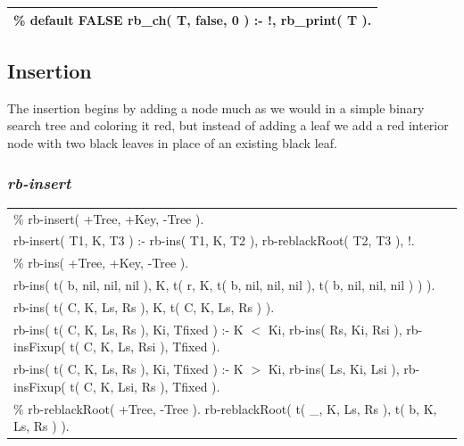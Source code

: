 \documentclass{article}
\newenvironment{code}{\obeycr\begin{it}\nopagebreak\addvspace{1ex}\noindent\footnotesize\begin{tabular}{|p{0.95\textwidth}|}\hline}{\\\hline\end{tabular}\par\addvspace{1ex}\end{it}\restorecr}
\newcommand{\inlinecode}[1]{\textit{#1}}
\begin{document}
\begin{code}
\% default FALSE
rb\_ch( T, false, 0 ) :- !, 
\hspace{2ex}rb\_print( T ).
\end{code}

\pagebreak
\subsection{Insertion}
The insertion begins by adding a node much as we would in a simple binary search tree and coloring it red, but instead of adding a leaf we add a red interior node with two black leaves in place of an existing black leaf. 

\subsubsection[\inlinecode{rb-insert}]{\inlinecode{rb-insert}}
\begin{code}
\% rb-insert( +Tree, +Key, -Tree ).\\
rb-insert( T1, K, T3 ) :-
\hspace{2ex} rb-ins( T1, K, T2 ), 
\hspace{2ex} rb-reblackRoot( T2, T3 ), !.\\
\% rb-ins( +Tree, +Key, -Tree ).\\
rb-ins( t( b, nil, nil, nil ), K, t( r, K, t( b, nil, nil, nil ), t( b, nil, nil, nil ) ) ).\\
rb-ins( t( C, K, Ls, Rs ), K, t( C, K, Ls, Rs ) ).\\
rb-ins( t( C, K, Ls, Rs ), Ki, Tfixed ) :-
\hspace{2ex} K $<$ Ki,
\hspace{2ex} rb-ins( Rs, Ki, Rsi ),
\hspace{2ex} rb-insFixup( t( C, K, Ls, Rsi ), Tfixed ).\\
rb-ins( t( C, K, Ls, Rs ), Ki, Tfixed ) :-
\hspace{2ex} K $>$ Ki,
\hspace{2ex} rb-ins( Ls, Ki, Lsi ),
\hspace{2ex} rb-insFixup( t( C, K, Lsi, Rs ), Tfixed ).\\
\% rb-reblackRoot( +Tree, -Tree ).
rb-reblackRoot( t( \_, K, Ls, Rs ), t( b, K, Ls, Rs ) ).
\end{code}
\end{document}
